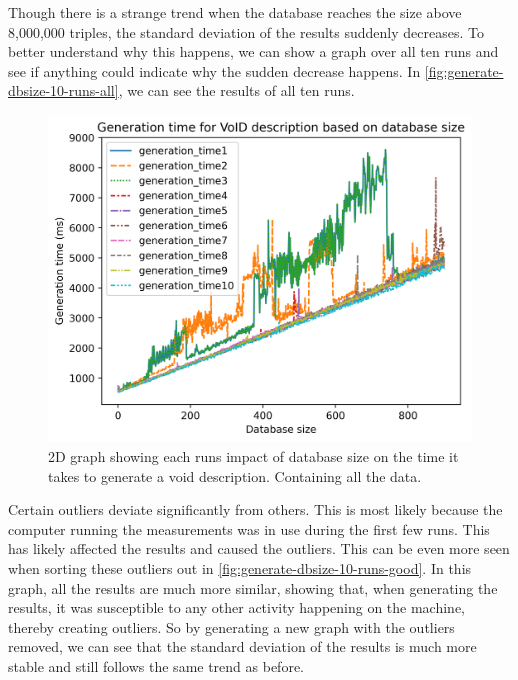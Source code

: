 Though there is a strange trend when the database reaches the size above 8,000,000 triples, the standard deviation of the results suddenly decreases. To better understand why this happens, we can show a graph over all ten runs and see if anything could indicate why the sudden decrease happens. In \autoref{fig:generate-dbsize-10-runs-all}, we can see the results of all ten runs.

\begin{figure}[htb!]
    \centering
    \includegraphics[width=0.8\columnwidth]{figures/generation-results-graph-all.png}
    \caption{2D graph showing each runs impact of database size on the time it takes to generate a \gls{void} description. Containing all the data.}
    \label{fig:generate-dbsize-10-runs-all}
\end{figure}

Certain outliers deviate significantly from others. This is most likely because the computer running the measurements was in use during the first few runs. This has likely affected the results and caused the outliers. This can be even more seen when sorting these outliers out in \autoref{fig:generate-dbsize-10-runs-good}. In this graph, all the results are much more similar, showing that, when generating the results, it was susceptible to any other activity happening on the machine, thereby creating outliers. So by generating a new graph with the outliers removed, we can see that the standard deviation of the results is much more stable and still follows the same trend as before.

